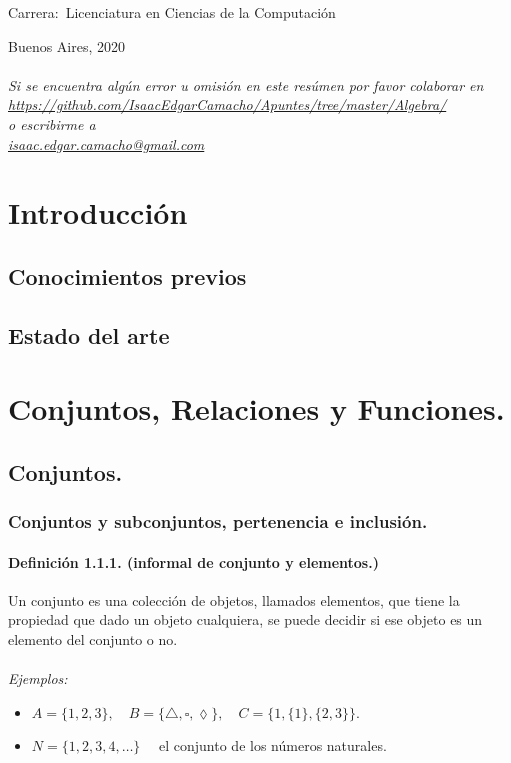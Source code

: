 \documentclass[12pt]{book}
\begin{document}
\noindent Carrera:\,	Licenciatura en Ciencias de la Computaci\'on

\vspace{1cm}

\vspace{1cm}

\noindent Buenos Aires, 2020
\\ 
\\
\textit{Si se encuentra alg\'un error u omisi\'on en este res\'umen por favor colaborar en \\
\url{https://github.com/IsaacEdgarCamacho/Apuntes/tree/master/Algebra/} \quad \\ o escribirme a \\ \url{isaac.edgar.camacho@gmail.com}
}

\newpage


\tableofcontents

\tableofcontents
\chapter{Introducción}
\section{Conocimientos previos}
\section{Estado del arte}


\chapter{Conjuntos, Relaciones y Funciones.}
\section{Conjuntos.}
\subsection{Conjuntos y subconjuntos, pertenencia e inclusión.}
\subsubsection{Definición 1.1.1. (informal de conjunto y elementos.)}
Un conjunto es una colección de objetos, llamados elementos, que tiene la
propiedad que dado un objeto cualquiera, se puede decidir si ese objeto es
un elemento del conjunto o no.
\\
\\
\textit{Ejemplos:}
\begin{itemize}
\item $A = \{1, 2, 3\} ,\quad B = \{\triangle, \square, \lozenge \} , \quad  C = \{1, \{1\}, \{2, 3\}\} .$
\item $N = \{1, 2, 3, 4, \dots \} \quad $ el conjunto de los números naturales.
\end{itemize}
\end{document}
